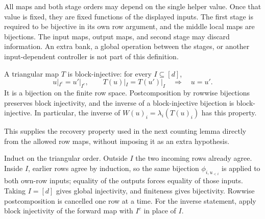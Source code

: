 All maps and both stage orders may depend on the single helper value.
Once that value is fixed, they are fixed functions of the displayed inputs.
The first stage is required to be bijective in its own row argument, and the
middle local maps are bijections.  The input maps, output maps, and second
stage may discard information.  An extra bank, a global operation between the
stages, or another input-dependent controller is not part of this definition.

\begin{lemma}\label{lem:local-block-injective}
A triangular map $T$ is block-injective: for every $I\subseteq[d]$,
\[
  u|_{I^c}=u'|_{I^c},\qquad T(u)|_I=T(u')|_I
       \quad\Longrightarrow\quad u=u'.
\]
It is a bijection on the finite row space.  Postcomposition by rowwise
bijections preserves block injectivity, and the inverse of a block-injective
bijection is block-injective.  In particular, the inverse of
$W(u)_i=\lambda_i(T(u)_i)$ has this property.
\end{lemma}
This supplies the recovery property used in the next counting lemma directly
from the allowed row maps, without imposing it as an extra hypothesis.
\begin{proofoutline}
Induct on the triangular order.  Outside $I$ the two incoming rows already
agree.  Inside $I$, earlier rows agree by induction, so the same bijection
$\phi_{i,u_{<i}}$ is applied to both own-row inputs; equality of the outputs
forces equality of those inputs.  Taking $I=[d]$ gives global injectivity,
and finiteness gives bijectivity.  Rowwise postcomposition is cancelled one
row at a time.  For the inverse statement, apply block injectivity of the
forward map with $I^c$ in place of $I$.
\end{proofoutline}

